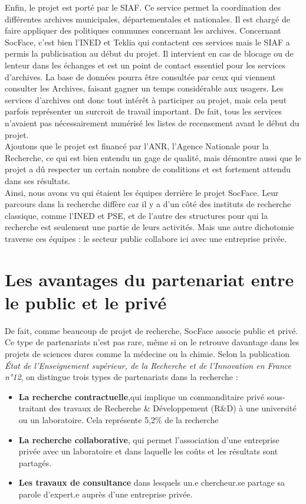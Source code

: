 Enfin, le projet est porté par le SIAF. Ce service permet la coordination des différentes archives municipales, départementales et nationales. Il est chargé de faire appliquer des politiques communes concernant les archives. Concernant SocFace, c’est bien l'\gls{INED} et Teklia qui contactent ces services mais le \gls{SIAF} a permis la publicisation au début du projet. Il intervient en cas de blocage ou de lenteur dans les échanges et est un point de contact essentiel pour les services d'archives. La base de données pourra être consultée par ceux qui viennent consulter les Archives, faisant gagner un temps considérable aux usagers. Les services d’archives ont donc tout intérêt à participer au projet, mais cela peut parfois représenter un surcroit de travail important. De fait, tous les services n’avaient pas nécessairement numérisé les listes de recensement avant le début du projet.\\
Ajoutons que le projet est financé par l’ANR, l’Agence Nationale pour la Recherche, ce qui est bien entendu un gage de qualité, mais démontre aussi que le projet a dû respecter un certain nombre de conditions et est fortement attendu dans ses résultats.\\

Ainsi, nous avons vu qui étaient les équipes derrière le projet SocFace. Leur parcours dans la recherche diffère car il y a d’un côté des instituts de recherche classique, comme l'\gls{INED} et \gls{PSE}, et de l’autre des structures pour qui la recherche est seulement une partie de leurs activités. Mais une autre dichotomie traverse ces équipes : le secteur public collabore ici avec une entreprise privée. 
    
    \section{Les avantages du partenariat entre le public et le privé}

De fait, comme beaucoup de projet de recherche, SocFace associe public et privé. Ce type de partenariats n’est pas rare, même si on le retrouve davantage dans les projets de sciences dures comme la médecine ou la chimie. Selon la publication \textit{État de l’Enseignement supérieur, de la Recherche et de l’Innovation en France n°12}, on distingue trois types de partenariats dans la recherche : 

    \begin{itemize}[label=\textbullet] %
    \item \textbf{La recherche contractuelle},qui implique un commanditaire privé sous-traitant des travaux de Recherche \& Développement (R\&D) à une université ou un laboratoire. Cela représente 5,2\% de la recherche
    \item \textbf{La recherche collaborative}, qui permet l’association d’une entreprise privée avec un laboratoire et dans laquelle les coûts et les résultats sont partagés. 
    \item \textbf{Les travaux de consultance} dans lesquels un.e chercheur.se partage sa parole d’expert.e auprès d’une entreprise privée. 
\end{itemize}

